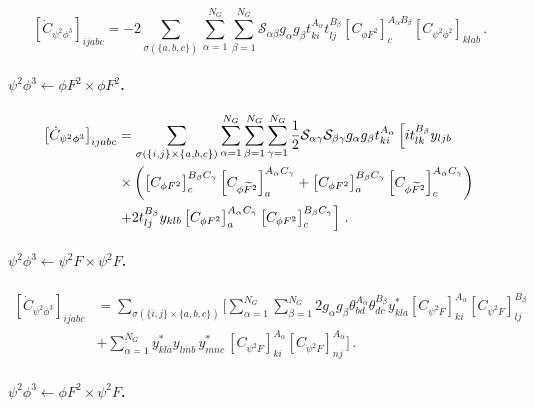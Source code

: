 \begin{equation}
    \left[\dot C_{\psi^2\phi^3}\right]_{ijabc} = - 2 \sum_{\sigma(\{a,b,c\})} \sum_{\alpha=1}^{N_G} \sum_{\beta=1}^{N_G} \mathcal S_{\alpha\beta}g_\alpha g_\beta t^{A_\alpha}_{ki} t^{B_\beta}_{lj}  \left[C_{\phi F^2}\right]^{A_\alpha B_\beta}_c \left[C_{\psi^2\phi^2}\right]_{klab} \,.
\end{equation}

\paragraph{$\psi^2\phi^3 \leftarrow \phi F^2 \times \phi F^2$.}

\begin{align}
    \left[\dot C_{\psi^2\phi^3}\right]_{ijabc} &= \sum_{\sigma(\{i,j\}\times\{a,b,c\})} \sum_{\alpha=1}^{N_G} \sum_{\beta=1}^{N_G}\sum_{\gamma=1}^{N_G}\frac{1}{2} \mathcal{S}_{\alpha\gamma} \mathcal{S}_{\beta\gamma}g_\alpha g_\beta t_{ki}^{A_\alpha} \left[  i t_{lk}^{B_\beta} y_{ljb} \right.\nonumber\\
    &\left.\times\left(\left[C_{\phi F^2}\right]_{c}^{B_\beta C_\gamma} \left[C_{\phi \widetilde{F}^2}\right]_{a}^{A_\alpha C_\gamma}+ \left[C_{\phi F^2}\right]_{a}^{B_\beta C_\gamma} \left[C_{\phi \widetilde{F}^2}\right]_{c}^{A_\alpha C_\gamma}\right)\right.\nonumber\\
    &\left. +  2 t_{lj}^{B_\beta} y_{klb} \left[C_{\phi F^2}\right]_a^{A_\alpha C_\gamma} \left[C_{\phi F^2}\right]_c^{B_\beta C_\gamma}\right]\,.
\end{align}

\paragraph{$\psi^2\phi^3 \leftarrow \psi^2 F \times \psi^2 F$.}

\begin{align}
    \left[\dot C_{\psi^2\phi^3}\right]_{ijabc} &= \sum_{\sigma(\{i,j\}\times\{a,b,c\})} \Bigg[\sum_{\alpha=1}^{N_G} \sum_{\beta=1}^{N_G} 2 g_\alpha g_\beta \theta^{A_\alpha}_{bd}\theta^{B_\beta}_{dc} y_{kla}^* \left[C_{\psi^2 F}\right]_{ki}^{A_\alpha}\left[C_{\psi^2 F}\right]_{lj}^{B_\beta}\nonumber\\
    & +\sum_{\alpha=1}^{N_G} y_{kla}^{*} y_{lmb}^{\phantom *} \, y^*_{mnc} \, \left[C_{\psi^2 F}\right]_{ki}^{A_\alpha}\left[C_{\psi^2 F}\right]_{nj}^{A_\alpha}\Bigg]\,. 
\end{align}

\paragraph{$\psi^2\phi^3 \leftarrow \phi F^2 \times \psi^2 F$.}

